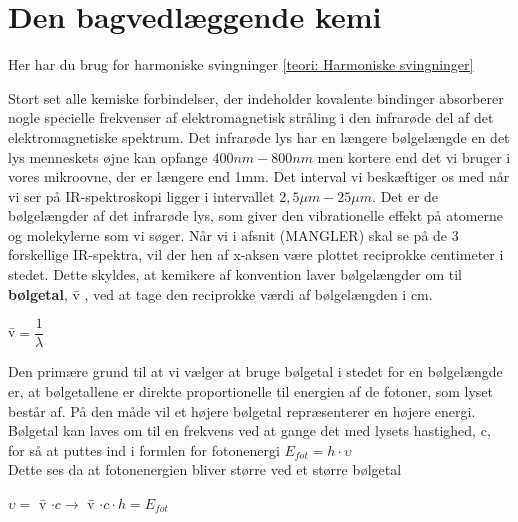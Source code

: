 \section{Den bagvedlæggende kemi}
Her har du brug for harmoniske svingninger \ref{teori: Harmoniske svingninger}

Stort set alle kemiske forbindelser, der indeholder kovalente bindinger absorberer nogle specielle frekvenser af elektromagnetisk stråling i den infrarøde del af det elektromagnetiske spektrum. Det infrarøde lys har en længere bølgelængde en det lys menneskets øjne kan opfange $400nm - 800nm$ men kortere end det vi bruger i vores mikroovne, der er længere end 1mm. Det interval vi beskæftiger os med når vi ser på IR-spektroskopi ligger i intervallet $2,5 \mu m- 25 \mu m $. Det er de bølgelængder af det infrarøde lys, som giver den vibrationelle effekt på atomerne og molekylerne som vi søger. Når vi i afsnit (MANGLER) skal se på de 3 forskellige IR-spektra, vil der hen af x-aksen være plottet reciprokke centimeter i stedet. Dette skyldes, at kemikere af konvention laver bølgelængder om til \textbf{bølgetal}, \={v} , ved at tage den reciprokke værdi af bølgelængden i cm. 

\begin{center}
\={v}$= \dfrac{1}{\lambda}$
\end{center}

Den primære grund til at vi vælger at bruge bølgetal i stedet for en bølgelængde er, at bølgetallene er direkte proportionelle til energien af de fotoner, som lyset består af. På den måde vil et højere bølgetal repræsenterer en højere energi. Bølgetal kan laves om til en frekvens ved at gange det med lysets hastighed, c, for så at puttes ind i formlen for fotonenergi $E_{fot} = h \cdot \upsilon$
\\
Dette ses da at fotonenergien bliver større ved et større bølgetal 
\\
\begin{center}
$\upsilon =$ \={v} $\cdot c \rightarrow$ \={v} $\cdot c \cdot h = E_{fot}$
\end{center}

